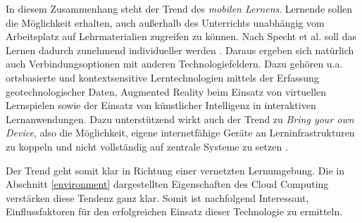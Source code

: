 In diesem Zusammenhang steht der Trend des \textit{mobilen Lernens}. Lernende sollen die Möglichkeit erhalten, auch außerhalb des Unterrichts unabhängig vom Arbeitsplatz auf Lehrmaterialien zugreifen zu können. Nach Specht et al. soll das Lernen dadurch zunehmend individueller werden \cite{specht}. Daraus ergeben sich natürlich auch Verbindungsoptionen mit anderen Technologiefeldern. Dazu gehören u.a. ortsbasierte und kontextsensitive Lerntechnologien mittels der Erfassung geotechnologischer Daten, Augmented Reality beim Einsatz von virtuellen Lernspielen sowie der Einsatz von künstlicher Intelligenz in interaktiven Lernanwendungen. Dazu unterstützend wirkt auch der Trend zu \textit{Bring your own Device}, also die Möglichkeit, eigene internetfähige Geräte an Lerninfrastrukturen zu koppeln und nicht vollständig auf zentrale Systeme zu setzen \cite{scheiter} \cite{meinel2}.

Der Trend geht somit klar in Richtung einer vernetzten Lernumgebung. Die in Abschnitt \ref{environment} dargestellten Eigenschaften des Cloud Computing verstärken diese Tendenz ganz klar. Somit ist nachfolgend Interessant, Einflussfaktoren für den erfolgreichen Einsatz dieser Technologie zu ermitteln.